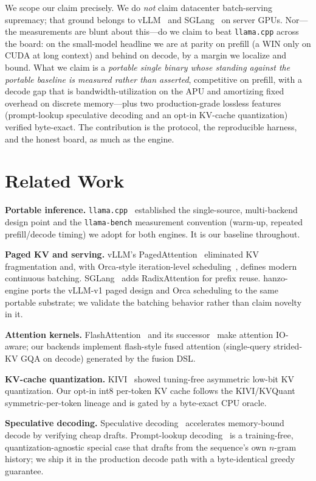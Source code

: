 \documentclass[11pt]{article}
\begin{document}
We scope our claim precisely. We do \emph{not} claim datacenter batch-serving supremacy;
that ground belongs to vLLM~\cite{paged2023} and SGLang~\cite{sglang2024} on server GPUs.
Nor---the measurements are blunt about this---do we claim to beat \texttt{llama.cpp} across
the board: on the small-model headline we are at parity on prefill (a WIN only on CUDA at
long context) and behind on decode, by a margin we localize and bound. What we claim is a
\emph{portable single binary whose standing against the portable baseline is measured rather
than asserted}, competitive on prefill, with a decode gap that is bandwidth-utilization on
the APU and amortizing fixed overhead on discrete memory---plus two production-grade lossless
features (prompt-lookup speculative decoding and an opt-in KV-cache quantization) verified
byte-exact. The contribution is the protocol, the reproducible harness, and the honest board,
as much as the engine.

\section{Related Work}\label{sec:related}
\textbf{Portable inference.} \texttt{llama.cpp}~\cite{llamacpp} established the
single-source, multi-backend design point and the \texttt{llama-bench} measurement
convention (warm-up, repeated prefill/decode timing) we adopt for both engines.
It is our baseline throughout.

\textbf{Paged KV and serving.} vLLM's PagedAttention~\cite{paged2023} eliminated KV
fragmentation and, with Orca-style iteration-level scheduling~\cite{orca2022}, defines
modern continuous batching. SGLang~\cite{sglang2024} adds RadixAttention for prefix
reuse. hanzo-engine ports the vLLM-v1 paged design and Orca scheduling to the same
portable substrate; we validate the batching behavior rather than claim novelty in it.

\textbf{Attention kernels.} FlashAttention~\cite{flashattention2022} and its
successor~\cite{flashattention2_2023} make attention IO-aware; our backends implement
flash-style fused attention (single-query strided-KV GQA on decode) generated by the
fusion DSL.

\textbf{KV-cache quantization.} KIVI~\cite{kivi2024} showed tuning-free asymmetric
low-bit KV quantization. Our opt-in int8 per-token KV cache follows the KIVI/KVQuant
symmetric-per-token lineage and is gated by a byte-exact CPU oracle.

\textbf{Speculative decoding.} Speculative decoding~\cite{leviathan2023} accelerates
memory-bound decode by verifying cheap drafts. Prompt-lookup decoding~\cite{promptlookup2023}
is a training-free, quantization-agnostic special case that drafts from the sequence's own
$n$-gram history; we ship it in the production decode path with a byte-identical greedy
guarantee.
\end{document}
